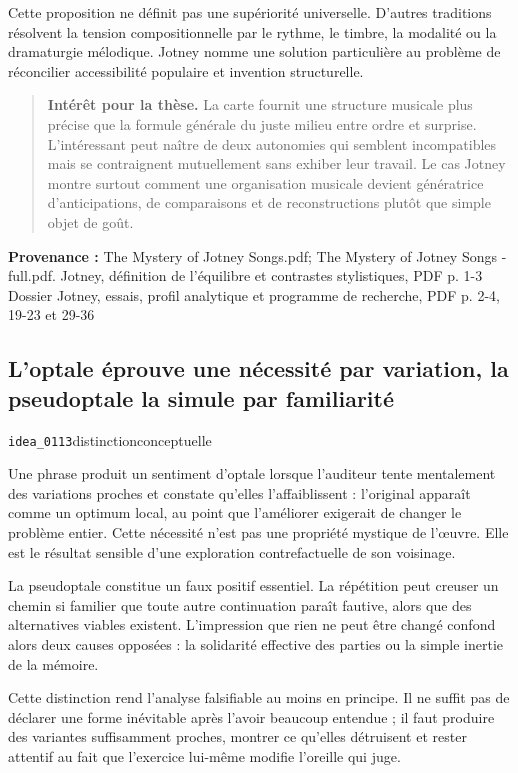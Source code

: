 \documentclass[10pt,a4paper]{article}
\begin{document}
Cette proposition ne définit pas une supériorité universelle. D'autres traditions résolvent la tension compositionnelle par le rythme, le timbre, la modalité ou la dramaturgie mélodique. Jotney nomme une solution particulière au problème de réconcilier accessibilité populaire et invention structurelle.

\begin{quote}
\textbf{Intérêt pour la thèse.} La carte fournit une structure musicale plus précise que la formule générale du juste milieu entre ordre et surprise. L'intéressant peut naître de deux autonomies qui semblent incompatibles mais se contraignent mutuellement sans exhiber leur travail. Le cas Jotney montre surtout comment une organisation musicale devient génératrice d'anticipations, de comparaisons et de reconstructions plutôt que simple objet de goût.
\end{quote}
{\footnotesize\color{metadata}\textbf{Provenance :} The Mystery of Jotney Songs.pdf; The Mystery of Jotney Songs -full.pdf. Jotney, définition de l'équilibre et contrastes stylistiques, PDF p. 1-3 Dossier Jotney, essais, profil analytique et programme de recherche, PDF p. 2-4, 19-23 et 29-36\par}

\subsection{L'optale éprouve une nécessité par variation, la pseudoptale la simule par familiarité}
{\small\color{metadata} \texttt{idea\_0113}\quad\textbullet\quad distinction\quad\textbullet\quad conceptuelle\par}

Une phrase produit un sentiment d'optale lorsque l'auditeur tente mentalement des variations proches et constate qu'elles l'affaiblissent : l'original apparaît comme un optimum local, au point que l'améliorer exigerait de changer le problème entier. Cette nécessité n'est pas une propriété mystique de l'œuvre. Elle est le résultat sensible d'une exploration contrefactuelle de son voisinage.

La pseudoptale constitue un faux positif essentiel. La répétition peut creuser un chemin si familier que toute autre continuation paraît fautive, alors que des alternatives viables existent. L'impression que rien ne peut être changé confond alors deux causes opposées : la solidarité effective des parties ou la simple inertie de la mémoire.

Cette distinction rend l'analyse falsifiable au moins en principe. Il ne suffit pas de déclarer une forme inévitable après l'avoir beaucoup entendue ; il faut produire des variantes suffisamment proches, montrer ce qu'elles détruisent et rester attentif au fait que l'exercice lui-même modifie l'oreille qui juge.
\end{document}
